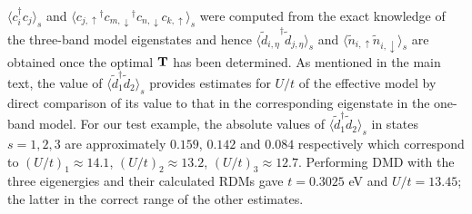 $\langle c_i^{\dagger} c_j \rangle_s$ and $\langle {c_{j,\uparrow}}^{\dagger} {c_{m,\downarrow}}^{\dagger} c_{n,\downarrow} c_{k,\uparrow} \rangle_{s}$ were computed from the exact knowledge of the three-band model eigenstates and hence $\langle {\tilde{d}_{i,\eta}}^{\dagger} \tilde{d}_{j,\eta} \rangle_{s}$ 
and $\langle \tilde{n}_{i,\uparrow} \tilde{n}_{i,\downarrow} \rangle_{s}$ are obtained 
once the optimal ${\bf T}$ has been determined. 
As mentioned in the main text, the value of $\langle \tilde{d}_1^{\dagger} \tilde{d}_2 \rangle_s$ provides estimates for $U/t$ of the effective model by direct comparison of its value to that in the 
corresponding eigenstate in the one-band model. For our test example, the absolute values of $\langle \tilde{d}_1^{\dagger} \tilde{d}_2 \rangle_s$ in states $s=1,2,3$ are approximately $0.159$, $0.142$ and $0.084$ respectively which correspond to $(U/t)_1 \approx 14.1 $, $(U/t)_2 \approx 13.2 $, $(U/t)_3 \approx 12.7 $. Performing DMD with the three eigenergies and their 
calculated RDMs gave $t=0.3025$ eV and $U/t = 13.45 $; the latter in the correct range of the other estimates.  
 
